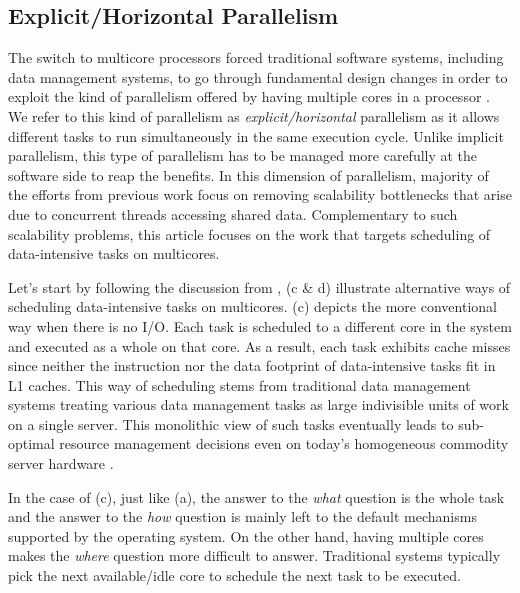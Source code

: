 \documentclass[11pt]{article}
\begin{document}
\subsection{Explicit/Horizontal Parallelism}
\label{sec:sched:expl}

The switch to multicore processors forced traditional software systems,
including data management systems,
to go through fundamental design changes in order to exploit
the kind of parallelism offered by having multiple cores in a processor \cite{AilamakiLTPP17}.
We refer to this kind of parallelism as \textit{explicit/horizontal} parallelism
as it allows different tasks to run simultaneously in the same execution cycle.
Unlike implicit parallelism,
this type of parallelism has to be managed more carefully at the software side to reap the benefits.
In this dimension of parallelism,
majority of the efforts from previous work focus on removing scalability bottlenecks that arise
due to concurrent threads accessing shared data.
Complementary to such scalability problems,
this article focuses on the work that targets scheduling of data-intensive tasks on multicores.

Let's start by following the discussion from ,
(c \& d) illustrate alternative ways of scheduling data-intensive tasks on multicores.
(c) depicts the more conventional way when there is no I/O.
Each task is scheduled to a different core in the system and executed as a whole on that core.
As a result, each task exhibits cache misses
since neither the instruction nor the data footprint of data-intensive tasks fit in L1 caches.
This way of scheduling stems from traditional data management systems treating various
data management tasks as large indivisible units of work on a single server.
This monolithic view of such tasks eventually leads to sub-optimal resource management
decisions even on today's homogeneous commodity server hardware \cite{TozunAAM14}.

In the case of (c), just like (a),
the answer to the \textit{what} question is the whole task
and the answer to the \textit{how} question is mainly left to the default mechanisms supported by the operating system.
On the other hand,
having multiple cores makes the \textit{where} question more difficult to answer.
Traditional systems typically pick the next available/idle core to schedule the next task to be executed.
\end{document}
